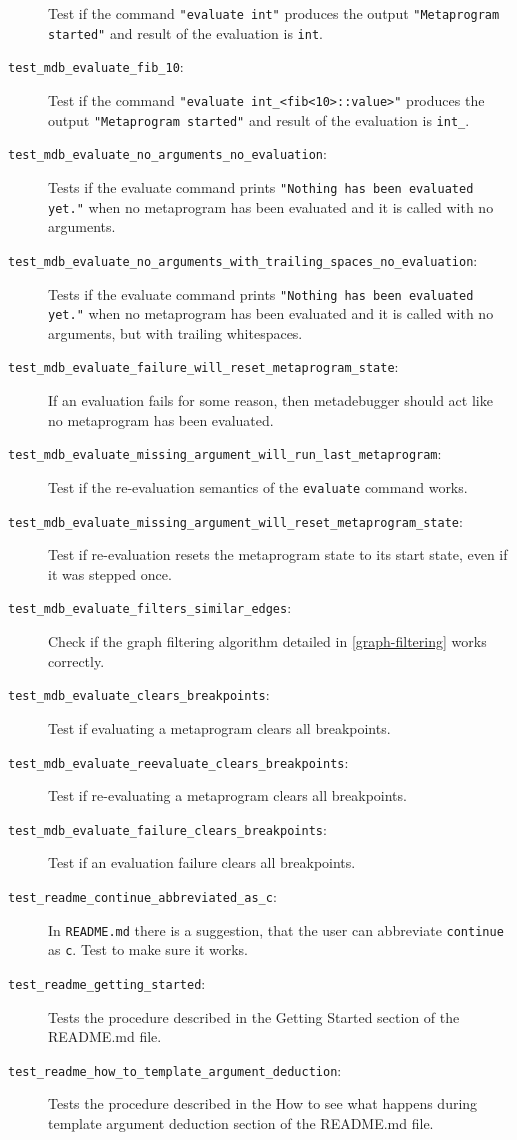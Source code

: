 \begin{description}
        Test if the command \texttt{"evaluate int"} produces the output
        \texttt{"Metaprogram started"} and result of the evaluation is
        \texttt{int}.
    \item[\texttt{test\_mdb\_evaluate\_fib\_10}:]
        Test if the command \texttt{"evaluate int\_<fib<10>::value>"} produces
        the output \texttt{"Metaprogram started"} and result of the evaluation
        is \texttt{int\_<55>}.
    \item[\texttt{test\_mdb\_evaluate\_no\_arguments\_no\_evaluation}:]
        Tests if the evaluate command prints
        \texttt{"Nothing has been evaluated yet."} when no metaprogram has been
        evaluated and it is called with no arguments.
    \item[\texttt{test\_mdb\_evaluate\_no\_arguments\_with\_trailing\_spaces\_no\_evaluation}:]
        Tests if the evaluate command prints
        \texttt{"Nothing has been evaluated yet."} when no metaprogram has been
        evaluated and it is called with no arguments, but with trailing
        whitespaces.
    \item[\texttt{test\_mdb\_evaluate\_failure\_will\_reset\_metaprogram\_state}:]
        If an evaluation fails for some reason, then metadebugger should act
        like no metaprogram has been evaluated.
    \item[\texttt{test\_mdb\_evaluate\_missing\_argument\_will\_run\_last\_metaprogram}:]
        Test if the re-evaluation semantics of the \texttt{evaluate} command
        works.
    \item[\texttt{test\_mdb\_evaluate\_missing\_argument\_will\_reset\_metaprogram\_state}:]
        Test if re-evaluation resets the metaprogram state to its start state,
        even if it was stepped once.
    \item[\texttt{test\_mdb\_evaluate\_filters\_similar\_edges}:]
        Check if the graph filtering algorithm detailed in
        \ref{graph-filtering} works correctly.
    \item[\texttt{test\_mdb\_evaluate\_clears\_breakpoints}:]
        Test if evaluating a metaprogram clears all breakpoints.
    \item[\texttt{test\_mdb\_evaluate\_reevaluate\_clears\_breakpoints}:]
        Test if re-evaluating a metaprogram clears all breakpoints.
    \item[\texttt{test\_mdb\_evaluate\_failure\_clears\_breakpoints}:]
        Test if an evaluation failure clears all breakpoints.
    \item[\texttt{test\_readme\_continue\_abbreviated\_as\_c}:]
        In \texttt{README.md} there is a suggestion, that the user can
        abbreviate \texttt{continue} as \texttt{c}. Test to make sure it works.
    \item[\texttt{test\_readme\_getting\_started}:]
        Tests the procedure described in the Getting Started section of the
        README.md file.
    \item[\texttt{test\_readme\_how\_to\_template\_argument\_deduction}:]
        Tests the procedure described in the How to see what happens during
        template argument deduction section of the README.md file.
\end{description}


